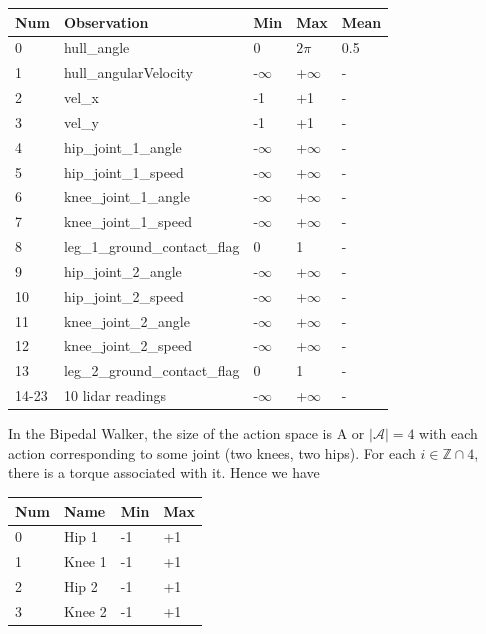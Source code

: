 \documentclass[man, 12pt]{apa6}
\begin{document}
\begin{table}[H]
\begin{tabular}{|l|l|l|l|l|}
\hline
Num   & Observation                   & Min  & Max  & Mean \\ \hline
0     & hull\_angle                   & 0    & $2 \pi$ & 0.5  \\ \hline
1     & hull\_angularVelocity         & -$\infty$ & +$\infty$ & -    \\ \hline
2     & vel\_x                        & -1   & +1   & -    \\ \hline
3     & vel\_y                        & -1   & +1   & -    \\ \hline
4     & hip\_joint\_1\_angle          & -$\infty$& +$\infty$& -    \\ \hline
5     & hip\_joint\_1\_speed          & -$\infty$ & +$\infty$& -    \\ \hline
6     & knee\_joint\_1\_angle         & -$\infty$& +$\infty$& -    \\ \hline
7     & knee\_joint\_1\_speed         & -$\infty$& +$\infty$& -    \\ \hline
8     & leg\_1\_ground\_contact\_flag & 0    & 1    & -    \\ \hline
9     & hip\_joint\_2\_angle          & -$\infty$& +$\infty$& -    \\ \hline
10    & hip\_joint\_2\_speed          & -$\infty$& +$\infty$& -    \\ \hline
11    & knee\_joint\_2\_angle         & -$\infty$& +$\infty$& -    \\ \hline
12    & knee\_joint\_2\_speed         & -$\infty$& +$\infty$& -    \\ \hline
13    & leg\_2\_ground\_contact\_flag & 0    & 1    & -    \\ \hline
14-23 & 10 lidar readings             & -$\infty$& +$\infty$& - \\  \hline
\end{tabular}
\end{table}

In the Bipedal Walker, the size of the action space is A or $\vert \mathcal{A} \vert = 4$ with each action corresponding to some joint (two knees, two hips). For each $i \in \mathbb{Z} \cap 4$, there is a torque associated with it. Hence we have

\begin{table}[H]
\begin{tabular}{|l|l|l|l|}
\hline
Num & Name   & Min & Max \\ \hline
0   & Hip 1  & -1  & +1  \\ \hline
1   & Knee 1 & -1  & +1  \\ \hline
2   & Hip 2  & -1  & +1  \\ \hline
3   & Knee 2 & -1  & +1  \\ \hline
\end{tabular}
\end{table}
\end{document}
